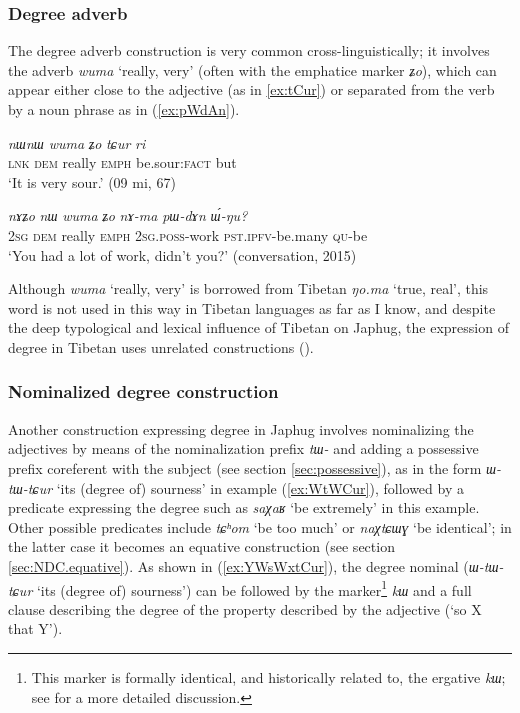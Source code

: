 \documentclass[oneside,a4paper,11pt]{article}
\newcommand{\ipa}[1]{{\phon\textit{#1}}}
\newcommand{\forme}[2]{\ipa{#1} `#2'}
\begin{document}
\subsubsection{Degree adverb} \label{sec:wuma}
The degree adverb construction is very common cross-linguistically; it involves the adverb \forme{wuma}{really, very} (often with the emphatice marker \ipa{ʑo}), which can appear either close to the adjective (as in \ref{ex:tCur}) or separated from the verb by a noun phrase as in (\ref{ex:pWdAn}).

\begin{exe}
\ex \label{ex:tCur}
\gll \ipa{tɕe} 	\ipa{nɯnɯ} 	\ipa{wuma} 	\ipa{ʑo} 	\ipa{tɕur} 	\ipa{ri} \\
\textsc{lnk} \textsc{dem} really  \textsc{emph} be.sour:\textsc{fact} but \\
\glt `It is very sour.' (09 mi, 67)
\end{exe}

\begin{exe}
\ex \label{ex:pWdAn}
\gll
\ipa{nɤʑo} 	\ipa{nɯ} 	\ipa{wuma} 	\ipa{ʑo} 	\ipa{nɤ-ma} 	\ipa{pɯ-dɤn} 	\ipa{ɯ́-ŋu?}  \\
\textsc{2sg} \textsc{dem} really \textsc{emph} \textsc{2sg.poss}-work \textsc{pst.ipfv}-be.many \textsc{qu}-be \\
\glt `You had a lot of work, didn't you?' (conversation, 2015)
\end{exe}

Although \forme{wuma}{really, very} is borrowed from Tibetan \ipa{ŋo.ma} `true, real', this word is not used in this way in Tibetan languages as far as I know, and despite the deep typological and lexical influence of Tibetan on Japhug, the expression of degree in Tibetan uses unrelated constructions (\citealt{simon15evaluative}).

\subsubsection{Nominalized degree construction} \label{sec:NDC}
Another construction expressing degree in Japhug involves nominalizing the adjectives by means of the nominalization prefix \ipa{tɯ-} and adding a possessive prefix coreferent with the subject (see section \ref{sec:possessive}), as in the form \forme{ɯ-tɯ-tɕur}{its (degree of) sourness} in example (\ref{ex:WtWCur}), followed by a predicate expressing the degree such as  \forme{saχaʁ}{be extremely} in this example. Other possible predicates include \forme{tɕʰom}{be too much} or \forme{naχtɕɯɣ}{be identical}; in the latter case it becomes an equative construction (see section \ref{sec:NDC.equative}).  As shown in (\ref{ex:YWsWxtCur}), the degree nominal (\ipa{ɯ-tɯ-tɕur} `its (degree of) sourness') can be followed by the marker\footnote{This marker is formally identical, and historically related to, the ergative \ipa{kɯ}; see \citet{jacques16comparative} for a more detailed discussion. } \ipa{kɯ} and a full clause describing the degree of the property described by the adjective (`so X that Y').
\end{document}
